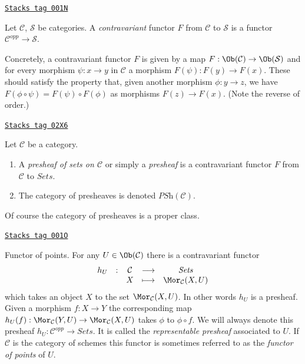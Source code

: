 \begin{definition}[Contravariant]
\label{categories-definition-contravariant}
\href{https://stacks.math.columbia.edu/tag/001N}{\texttt{Stacks tag 001N}}

Let $\mathcal{C}$, $\mathcal{S}$ be categories.
A {\it contravariant} functor $F$
from $\mathcal{C}$ to $\mathcal{S}$
is a functor $\mathcal{C}^{opp}\to \mathcal{S}$.
\end{definition}

Concretely, a contravariant functor $F$ is given
by a map $F : \Ob(\mathcal{C}) \to
\Ob(\mathcal{S})$ and for every morphism
$\psi : x \to y$ in $\mathcal{C}$ a morphism
$F(\psi) : F(y) \to F(x)$. These should satisfy the property
that, given another morphism
$\phi : y \to z$, we have $F(\phi \circ \psi)
= F(\psi) \circ F(\phi)$ as morphisms $F(z) \to F(x)$.
(Note the reverse of order.)

\begin{definition}[Presheaf]
\label{categories-definition-presheaf}
\href{https://stacks.math.columbia.edu/tag/02X6}{\texttt{Stacks tag 02X6}}

Let $\mathcal{C}$ be a category.
\begin{enumerate}
\item A {\it presheaf of sets on $\mathcal{C}$}
or simply a {\it presheaf} is a contravariant functor
$F$ from $\mathcal{C}$ to $\textit{Sets}$.
\item The category of presheaves is denoted $\textit{PSh}(\mathcal{C})$.
\end{enumerate}
\end{definition}

Of course the category of presheaves is a proper class.

\begin{example}
\label{categories-example-hom-functor}
\href{https://stacks.math.columbia.edu/tag/001O}{\texttt{Stacks tag 001O}}

Functor of points.
For any $U\in \Ob(\mathcal{C})$ there is a contravariant
functor
$$
\begin{matrix}
h_U & : & \mathcal{C}
&
\longrightarrow
&
\textit{Sets} \\
& &
X
&
\longmapsto
&
\Mor_\mathcal{C}(X, U)
\end{matrix}
$$
which takes an object $X$ to the set
$\Mor_\mathcal{C}(X, U)$. In other words $h_U$ is a presheaf.
Given a morphism $f : X\to Y$ the corresponding map
$h_U(f) : \Mor_\mathcal{C}(Y, U)\to \Mor_\mathcal{C}(X, U)$
takes $\phi$ to $\phi\circ f$. We will always denote
this presheaf $h_U : \mathcal{C}^{opp} \to \textit{Sets}$.
It is called the {\it representable presheaf} associated to $U$.
If $\mathcal{C}$ is the category of schemes this functor is
sometimes referred to as the
\emph{functor of points} of $U$.
\end{example}

